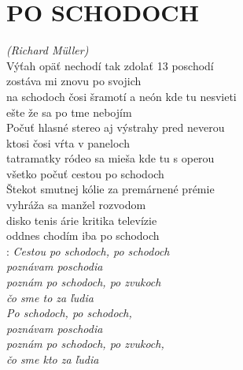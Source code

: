 \section*{\Huge PO SCHODOCH}
\emph{(Richard Müller)}\\

Výťah opäť nechodí tak zdolať 13 poschodí\\
zostáva mi znovu po svojich\\
na schodoch čosi šramotí a neón kde tu nesvieti\\
ešte že sa po tme nebojím\\

Počuť hlasné stereo aj výstrahy pred neverou\\
ktosi čosi vŕta v paneloch\\
tatramatky ródeo sa mieša kde tu s operou\\
všetko počuť cestou po schodoch\\

Štekot smutnej kólie za premárnené prémie\\
vyhráža sa manžel rozvodom\\
disko tenis árie kritika televízie\\
oddnes chodím iba po schodoch\\

\textregistered: \emph{Cestou po schodoch, po schodoch\\
poznávam poschodia\\
poznám po schodoch, po zvukoch\\
čo sme to za ľudia}\\

\emph{Po schodoch, po schodoch,\\
poznávam poschodia\\
poznám po schodoch, po zvukoch,\\
čo sme kto za ľudia}

\newpage
